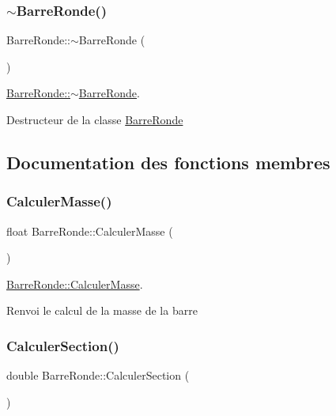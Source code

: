 \subsubsection{\texorpdfstring{$\sim$\+Barre\+Ronde()}{~BarreRonde()}}
{\footnotesize\ttfamily Barre\+Ronde\+::$\sim$\+Barre\+Ronde (\begin{DoxyParamCaption}{ }\end{DoxyParamCaption})}



\hyperlink{class_barre_ronde_aa62c3c350d2153aefcab64a20a6a795a}{Barre\+Ronde\+::$\sim$\+Barre\+Ronde}. 

Destructeur de la classe \hyperlink{class_barre_ronde}{Barre\+Ronde} 

\subsection{Documentation des fonctions membres}
\mbox{\label{class_barre_ronde_a450c58e2bfcb1300339f1c790740e5ad}} 
\subsubsection{\texorpdfstring{Calculer\+Masse()}{CalculerMasse()}}
{\footnotesize\ttfamily float Barre\+Ronde\+::\+Calculer\+Masse (\begin{DoxyParamCaption}{ }\end{DoxyParamCaption})}



\hyperlink{class_barre_ronde_a450c58e2bfcb1300339f1c790740e5ad}{Barre\+Ronde\+::\+Calculer\+Masse}. 

Renvoi le calcul de la masse de la barre \mbox{\label{class_barre_ronde_adc6f65b51c7ca244fb29f2ed4b9a6f91}} 
\subsubsection{\texorpdfstring{Calculer\+Section()}{CalculerSection()}}
{\footnotesize\ttfamily double Barre\+Ronde\+::\+Calculer\+Section (\begin{DoxyParamCaption}{ }\end{DoxyParamCaption})}



